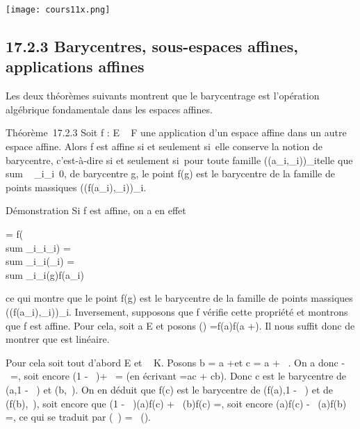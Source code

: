 \documentclass[]{article}
\begin{document}
\texttt{[image: cours11x.png]}

\subsection{17.2.3 Barycentres, sous-espaces affines, applications
affines}

Les deux théorèmes suivants montrent que le barycentrage est l'opération
algébrique fondamentale dans les espaces affines.

Théorème~17.2.3 Soit f : E \rightarrow~ F une application d'un espace affine dans
un autre espace affine. Alors f est affine si et seulement si~elle
conserve la notion de barycentre, c'est-à-dire si et seulement si~pour
toute famille \left
((a_i,\lambda_i)\right )_i\inI telle que
\\sum ~
_i\inI\lambda_i\neq~0, de barycentre g,
le point f(g) est le barycentre de la famille de points massiques
\left
((f(a_i),\lambda_i)\right )_i\inI.

Démonstration Si f est affine, on a en effet

 =\vec
f(\\sum
_i\inI\lambda_i\overrightarrowga_i)
= \\sum
_i\inI\lambda_i\vecf(\overrightarrowga_i)
= \\sum
_i\inI\lambda_i\overrightarrowf(g)f(a_i)

ce qui montre que le point f(g) est le barycentre de la famille de
points massiques \left
((f(a_i),\lambda_i)\right )_i\inI.
Inversement, supposons que f vérifie cette propriété et montrons que f
est affine. Pour cela, soit a \in E et posons
\vecf(\overrightarrow\xi)
=\overrightarrow f(a)f(a
+\overrightarrow \xi). Il nous suffit donc de montrer
que \vecf est linéaire.

Pour cela soit tout d'abord \overrightarrow\xi
\in\overrightarrow E et \lambda~ \in K. Posons b = a
+\overrightarrow \xi et c = a +
\lambda~\overrightarrow\xi. On a donc
\overrightarrowac -
\lambda~\overrightarrowab =, soit encore (1 - \lambda~)\overrightarrowac +
\lambda~\overrightarrowbc = (en écrivant \overrightarrowab
=\overrightarrow ac +\overrightarrow
cb). Donc c est le barycentre de (a,1 - \lambda~) et (b,\lambda~). On en déduit que
f(c) est le barycentre de (f(a),1 - \lambda~) et de (f(b),\lambda~), soit encore que
(1 - \lambda~)\overrightarrowf(a)f(c) +
\lambda~\overrightarrowf(b)f(c)
=, soit encore
\overrightarrowf(a)f(c) -
\lambda~\overrightarrowf(a)f(b)
=, ce qui se traduit par
\vecf(\lambda~\overrightarrow\xi) =
\lambda~\vecf(\overrightarrow\xi).
\end{document}
